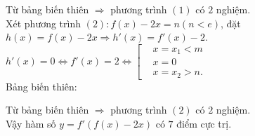 \begin{ex}
{		\begin{center}
		\end{center}
		\noindent	Từ bảng biến thiên $\Rightarrow$ phương trình $(1)$ có $2$ nghiệm.\\
		Xét phương trình $(2):f(x)-2x=n\left(n<e\right)$, đặt $h(x)=f(x)-2x\Rightarrow h'(x)=f'(x)-2$.\\
		$h'(x)=0\Leftrightarrow f'(x)=2\Leftrightarrow\left[\begin{aligned}
			&x=x_1<m\\ 
			&x=0\\ 
			&x=x_2>n.
		\end{aligned}\right.$\\
		Bảng biến thiên:	 \begin{center}
		\end{center}
		Từ bảng biến thiên $\Rightarrow$ phương trình $(2)$ có $2$ nghiệm.\\
		Vậy hàm số $y=f'\left(f(x)-2x\right)$ có $7$ điểm cực trị.
	}
\end{ex}

